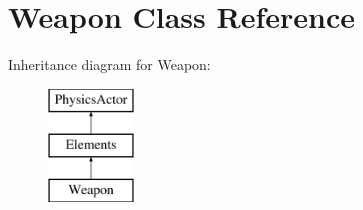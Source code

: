 \hypertarget{class_weapon}{\section{Weapon Class Reference}
\label{class_weapon}
}
Inheritance diagram for Weapon\+:\begin{figure}[H]
\begin{center}
\leavevmode
\includegraphics[height=3.000000cm]{class_weapon}
\end{center}
\end{figure}
